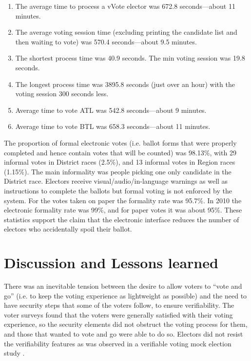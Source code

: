 \documentclass[twocolumn]{article}
\begin{document}
\begin{enumerate}
\item The average time to process a vVote elector was 672.8 seconds---about 11 minutes.
\item The average voting session time (excluding printing the candidate list and then waiting to vote) was 570.4 seconds---about 9.5 minutes.   
\item The shortest process time was 40.9 seconds.  The min voting session was 19.8 seconds.  
\item The longest process time was 3895.8 seconds (just over an hour) with the voting session 300 seconds less.
\item Average time to vote ATL was 542.8 seconds---about 9 minutes.
\item Average time to vote BTL was 658.3 seconds---about 11 minutes.
\end{enumerate}

The proportion of formal electronic votes (i.e. ballot forms that were properly completed and hence contain votes that will be counted) was 98.13\%, with 29 informal votes in District races (2.5\%), and 13 informal votes in Region races (1.15\%).
The main informality was people picking one only candidate in the District race.  Electors receive visual/audio/in-language warnings as well as instructions to complete the ballots but formal voting is not enforced by the system. For the votes taken on paper the formality rate was 95.7\%.  In 2010 the electronic formality rate was 99\%, and for paper votes it was about 95\%.   These statistics support the claim that the electronic interface reduces the number of electors who accidentally spoil their ballot. 



\section{Discussion and Lessons learned}

There was an inevitable tension between the desire to allow voters to ``vote and go'' (i.e. to keep the voting experience as lightweight as possible) and the need to have security steps that some of the voters follow, to ensure verifiability.  The voter surveys found that the voters were generally satisfied with their voting experience, so the security elements did not obstruct the voting process for them, and those that wanted to vote and go were able to do so.  Electors did not resist the verifiability features as was observed in a verifiable voting mock election study \cite{DBLP:conf/stast/KarayumakKOVV11}.
\end{document}
